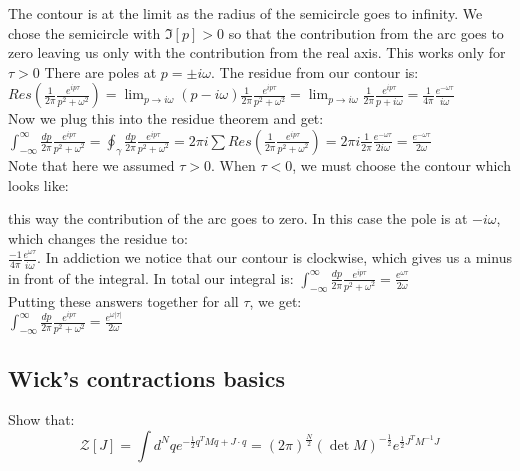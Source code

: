 \documentclass{article}
\begin{document}
The contour is at the limit as the radius of the semicircle goes to infinity. We chose the semicircle with $\Im[p]>0$ so that the contribution from the arc goes to zero leaving us only with the contribution from the real axis. This works only for $\tau > 0$ There are poles at $p=\pm i\omega$. The residue from our contour is:\\
$Res(\frac{1}{2\pi}\frac{e^{ip\tau}}{p^2+\omega^2})= \lim_{p\rightarrow i\omega}(p-i\omega)\frac{1}{2\pi}\frac{e^{ip\tau}}{p^2+\omega^2}=$$\lim_{p\rightarrow i\omega}\frac{1}{2\pi}\frac{e^{ip\tau}}{p+i\omega}=$$\frac{1}{4\pi}\frac{e^{-\omega\tau}}{i\omega}$\\
Now we plug this into the residue theorem and get:\\
$\int_{-\infty}^{\infty}\frac{dp}{2\pi}\frac{e^{ip\tau}}{p^2+\omega^2}=\oint_\gamma\frac{dp}{2\pi}\frac{e^{ip\tau}}{p^2+\omega^2}=2\pi i\sum Res(\frac{1}{2\pi}\frac{e^{ip\tau}}{p^2+\omega^2})=2 \pi i \frac{1}{2\pi}\frac{e^{-\omega\tau}}{2i\omega}=\frac{e^{-\omega\tau}}{2\omega}$\\
Note that here we assumed $\tau > 0$. When $\tau < 0$, we must choose the contour which looks like: 


this way the contribution of the arc goes to zero. In this case the pole is at $-i\omega$, which changes the residue to:\\
$\frac{-1}{4\pi}\frac{e^{\omega\tau}}{i\omega}$. In addiction we notice that our contour is clockwise, which gives us a minus in front of the integral. In total our integral is:
$\int_{-\infty}^{\infty}\frac{dp}{2\pi}\frac{e^{ip\tau}}{p^2+\omega^2}=\frac{e^{\omega\tau}}{2\omega}$\\
Putting these answers together for all $\tau$, we get:\\
$\boxed{\int_{-\infty}^{\infty}\frac{dp}{2\pi}\frac{e^{ip\tau}}{p^2+\omega^2}=\frac{e^{\omega|\tau|}}{2\omega}}$\\
\subsection*{Wick's contractions basics}
Show that:
\begin{equation} \label{eq:zed}
\mathcal{Z}[J]=\int d^N q e^{-\frac{1}{2} q^T M q+J \cdot q}=(2 \pi)^{\frac{N}{2}}(\operatorname{det} M)^{-\frac{1}{2}} e^{\frac{1}{2} J^T M^{-1} J} 
\end{equation}
\end{document}
